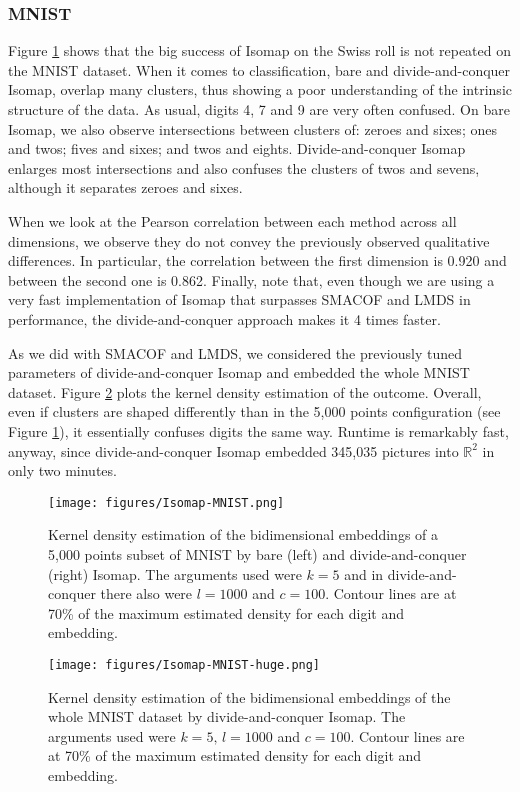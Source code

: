 \subsubsection{MNIST}

Figure \ref{fig:Isomap-MNIST} shows that the big success of Isomap on the Swiss roll is not repeated on the MNIST dataset. When it comes to classification, bare and divide-and-conquer Isomap, overlap many clusters, thus showing a poor understanding of the intrinsic structure of the data. As usual, digits 4, 7 and 9 are very often confused. On bare Isomap, we also observe intersections between clusters of: zeroes and sixes; ones and twos; fives and sixes; and twos and eights. Divide-and-conquer Isomap enlarges most intersections and also confuses the clusters of twos and sevens, although it separates zeroes and sixes.

When we look at the Pearson correlation between each method across all dimensions, we observe they do not convey the previously observed qualitative differences. In particular, the correlation between the first dimension is 0.920 and between the second one is 0.862. Finally, note that, even though we are using a very fast implementation of Isomap that surpasses SMACOF and LMDS in performance, the divide-and-conquer approach makes it 4 times faster.

As we did with SMACOF and LMDS, we considered the previously tuned parameters of divide-and-conquer Isomap and embedded the whole MNIST dataset. Figure \ref{fig:Isomap-MNIST-huge} plots the kernel density estimation of the outcome. Overall, even if clusters are shaped differently than in the 5,000 points configuration (see Figure \ref{fig:Isomap-MNIST}), it essentially confuses  digits the same way. Runtime is remarkably fast, anyway, since divide-and-conquer Isomap embedded 345,035 pictures into $\mathbb{R}^2$ in only two minutes.

\begin{figure}
    \centering
    \texttt{[image: figures/Isomap-MNIST.png]}
    \caption{Kernel density estimation of the bidimensional embeddings of a 5,000 points subset of MNIST by bare (left) and divide-and-conquer (right) Isomap. The arguments used were $k=5$ and in divide-and-conquer there also were $l=1000$ and $c=100$. Contour lines are at 70\% of the maximum estimated density for each digit and embedding.}
    \label{fig:Isomap-MNIST}
\end{figure}

\begin{figure}
    \centering
    \texttt{[image: figures/Isomap-MNIST-huge.png]}
    \caption{Kernel density estimation of the bidimensional embeddings of the whole MNIST dataset by divide-and-conquer Isomap. The arguments used were $k=5, \, l=1000$ and $c=100$. Contour lines are at 70\% of the maximum estimated density for each digit and embedding.}
    \label{fig:Isomap-MNIST-huge}
\end{figure}


